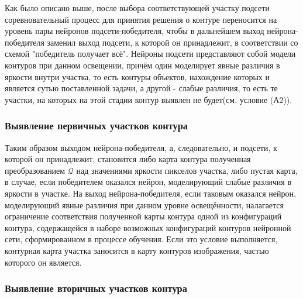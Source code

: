 \documentclass[a4paper,12pt]{report}
\begin{document}
Как было описано выше, после выбора соответствующей участку подсети соревновательный процесс для принятия решения о контуре переносится на уровень пары нейронов подсети-победителя, чтобы в дальнейшем выход нейрона-победителя заменил выход подсети, к которой он принадлежит, в соответствии со схемой "победитель получает всё". Нейроны подсети представляют собой модели контуров при данном освещении, причём один моделирует явные различия в яркости внутри участка, то есть контуры объектов, нахождение которых и является сутью поставленной задачи, а другой - слабые различия, то есть те участки, на которых на этой стадии контур выявлен не будет(см. условие (А2)). 

\subsubsection{Выявление первичных участков контура}

Таким образом выходом нейрона-победителя, а, следовательно, и подсети, к которой он принадлежит, становится либо карта контура полученная преобразованием $\mathcal{Q}$ над значениями яркости пикселов участка, либо пустая карта, в случае, если победителем оказался нейрон, моделирующий слабые различия в яркости в участке. На выход нейрона-победителя, если таковым оказался нейрон, моделирующий явные различия при данном уровне освещённости, налагается ограничение соответствия полученной карты контура одной из конфигураций контура, содержащейся в наборе возможных конфигураций контуров нейронной сети, сформированном в процессе обучения. Если это условие выполняется, контурная карта участка заносится в карту контуров изображения, частью которого он является. 
 
\subsubsection{Выявление вторичных участков контура}
\end{document}
